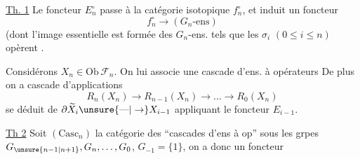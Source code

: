 \uline{Th. 1}  Le foncteur $E_n^\circ$ passe à la catégorie isotopique $f_n^\circ$, et induit un foncteur 
\[ f_n^\circ\longrightarrow(G_n\text{-ens}) \]
(dont l'image essentielle est formée des $G_n$-ens. tels que les $\sigma_i$ $(0\leq i\leq n)$  opèrent  .

Considérons $X_n\in\mathrm{Ob}\,\mathcal F_n$. On lui associe une cascade d'ens. à opérateurs
De plus on a    cascade d'applications
\[ R_n(X_n)\to R_{n-1}(X_n)\to\ldots\to R_0(X_n) \]
se déduit de $\partial\widetilde X_i\unsure{\text{---}|\to}X_{i-1}$  appliquant le foncteur $E_{i-1}$.

\uline{Th 2}  Soit $(\mathrm{Casc}_n)$ la catégorie des ``cascades d'ens à op'' sous les grpes $G_{\unsure{n-1|n+1}},G_n,\ldots,G_0$, $G_{-1}=\{1\}$, on a donc un foncteur
